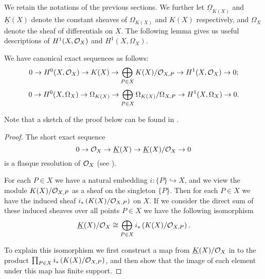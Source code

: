 \begin{cor}
We retain the notations of the previous sections.
We further let $\underline{\Omega}_{K(X)}$ and $\underline{K}(X)$ denote the constant sheaves of $\Omega_{K(X)}$ and $K(X)$ respectively, and $\Omega_X$ denote the sheaf of differentials on $X$.
The following lemma gives us useful descriptions of $H^1(X,\mathcal{O}_X)$ and $H^1(X,\Omega_X)$.
    \begin{lem}\label{lemmaexactsequenceofhoneandhzero}
    We have canonical exact sequences as follows:
        \begin{equation}\label{equationinitialdualitylesfunctions}
        0 \rightarrow H^0(X,{\cal O}_X) \rightarrow K(X) \rightarrow \bigoplus_{P \in X} K(X)/{\cal O}_{X,P} \rightarrow H^1(X,\mathcal{O}_X) \rightarrow  0;
        \end{equation}
        \begin{equation}\label{equationinitialdualitysesdifferentials}
        0 \rightarrow {H^0(X,\Omega_X)} \rightarrow \Omega_{K(X)} \rightarrow \bigoplus_{P \in X}\Omega_{K(X)}/\Omega_{X,P} \rightarrow H^1(X,\Omega_X) \rightarrow 0.
        \end{equation}
    \end{lem}
    \begin{rem}
    Note that a sketch of the proof below can be found in \cite[Pg.\ 248]{hart}.
        \end{rem}
    \begin{proof}
    The short exact sequence
        \begin{equation}\label{equationinitialdualitysesfunctions}
        0 \rightarrow {\cal O}_X \rightarrow \underline{K}(X) \rightarrow \underline{K}(X)/{\cal O}_X \rightarrow 0
        \end{equation}
    is a flasque resolution of ${\cal O}_X$ (see \cite[Chap.\ II, ex.\ 1.16]{hart}).
    
    For each $P \in X$ we have a natural embedding $i\colon \{P\} \hookrightarrow X$, and we view the module $K(X)/{\cal O}_{X,P}$ as a sheaf on the singleton $\{P\}$.
    Then for each $P\in X$ we have the induced sheaf $i_*\left( K(X)/{\cal O}_{X,P} \right)$ on $X$.
    If we consider the direct sum of these induced sheaves over all points $P\in X$ we have the following isomorphism
        \begin{equation}\label{equationsheafisomorphism}
        \underline{K}(X)/{\cal O}_X\cong \bigoplus_{P\in X} i_*\left(K(X)/{\cal O}_{X,P}\right).
        \end{equation}
    
    
    To explain this isomorphism we first construct a map from $\underline{K}(X)/{\cal O}_X$ in to the product $\prod_{P \in X} i_*\left({K(X)}/{\cal O}_{X,P}\right)$, and then show that the image of each element under this map has finite support.
    

\end{proof}
\end{cor}

